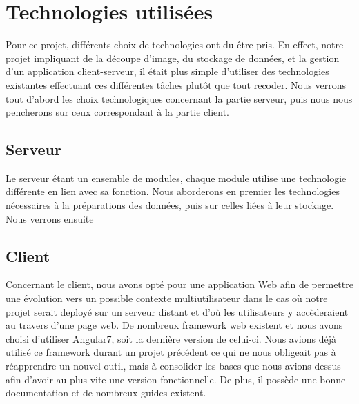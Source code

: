 \chapter{Technologies utilisées}

Pour ce projet, différents choix de technologies ont du être pris. En effect, notre projet impliquant de la découpe d'image, du stockage de données, et la gestion d'un application client-serveur, il était plus simple d'utiliser des technologies existantes effectuant ces différentes tâches plutôt que tout recoder.
Nous verrons tout d'abord les choix technologiques concernant la partie serveur, puis nous nous pencherons sur ceux correspondant à la partie client.

\section{Serveur}

Le serveur étant un ensemble de modules, chaque module utilise une technologie différente en lien avec sa fonction. Nous aborderons en premier les technologies nécessaires à la préparations des données, puis sur celles liées à leur stockage. Nous verrons ensuite 

\section{Client}

Concernant le client, nous avons opté pour une application Web afin de permettre une évolution vers un possible contexte multiutilisateur dans le cas où notre projet serait deployé sur un serveur distant et d'où les utilisateurs y accèderaient au travers d'une page web. De nombreux framework web existent et nous avons choisi d'utiliser Angular7, soit la dernière version de celui-ci. Nous avions déjà utilisé ce framework durant un projet précédent ce qui ne nous obligeait pas à réapprendre un nouvel outil, mais à consolider les bases que nous avions dessus afin d'avoir au plus vite une version fonctionnelle. De plus, il possède une bonne documentation et de nombreux guides existent.